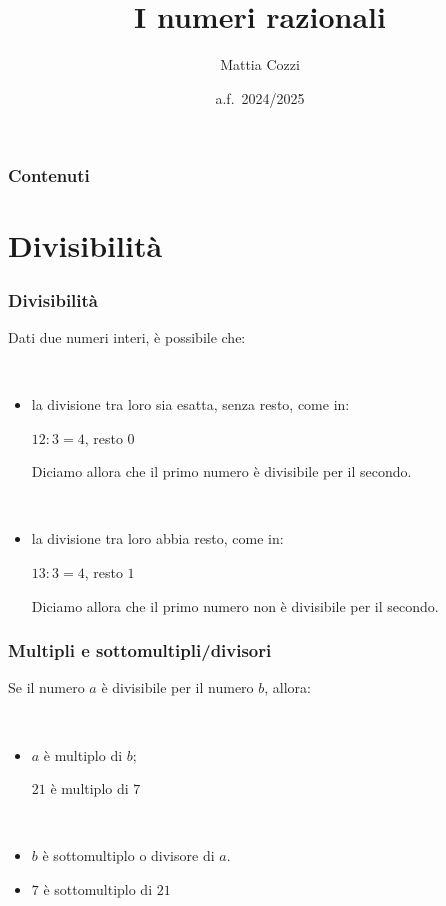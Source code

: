 \documentclass[]{beamer}
\title{I numeri razionali}
\author{Mattia Cozzi}
\date{a.f.~2024/2025}
\theoremstyle{plain}
\begin{document}
\begin{frame}
  \titlepage
\end{frame}





\begin{frame}
\frametitle{Contenuti}
\tableofcontents
\end{frame}


\section{Divisibilità}

\begin{frame}
\frametitle{Divisibilità}
Dati due numeri interi, è possibile che:

~
\begin{itemize}
  \item la divisione tra loro sia esatta, senza resto, come in:
  \begin{center}$ 12 : 3 = 4$, resto $0$\end{center}
  Diciamo allora che il primo numero \alert{è divisibile} per il secondo.\pause

  ~
  \item  la divisione tra loro abbia resto, come in:
  \begin{center}$ 13 : 3 = 4$, resto $1$\end{center}
  Diciamo allora che il primo numero \alert{non è divisibile} per il secondo.
\end{itemize}
\end{frame}


\begin{frame}
\frametitle{Multipli e sottomultipli/divisori}
Se il numero $a$ è divisibile per il numero $b$, allora:

~
\begin{itemize}
  \item $a$ è \alert{multiplo} di $b$;
  \begin{center}$21$ è multiplo di $7$\end{center}\pause
  
  ~
  \item $b$ è \alert{sottomultiplo o divisore} di $a$.
  \item \begin{center}$7$ è sottomultiplo di $21$\end{center}
\end{itemize}
\end{frame}
\end{document}
